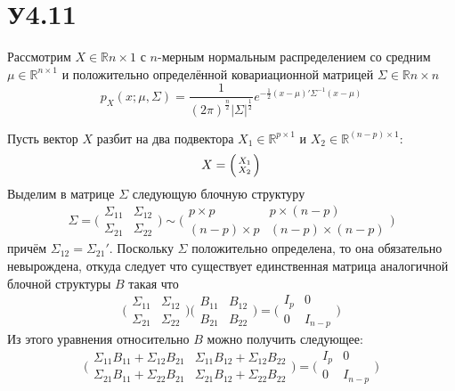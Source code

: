 \documentclass[a4paper]{article}
\newcommand{\Real}{\mathbb{R}}
\begin{document}

\section{У4.11} %
\label{sec:problem_4_11}

Рассмотрим $X\in \Real{n\times 1}$ с $n$-мерным нормальным распределением со
средним $\mu\in \Real^{n\times 1}$ и положительно определённой ковариационной
матрицей $\Sigma \in \Real{n\times n}$
\[
p_X(x;\mu,\Sigma)
= \frac{1}{(2\pi)^\frac{n}{2} \lvert \Sigma \rvert^\frac{1}{2}}
	e^{-\frac{1}{2}(x-\mu)'\Sigma^{-1}(x-\mu)}
\]

Пусть вектор $X$ разбит на два подвектора $X_1\in \Real^{p\times 1}$ и $X_2\in \Real^{(n-p)\times 1}$:
\[X = \Bigl(\begin{smallmatrix} X_1 \\ X_2 \end{smallmatrix}\Bigr)\]
Выделим в матрице $\Sigma$ следующую блочную структуру
\[
\Sigma
= \biggl(\begin{matrix}\Sigma_{11} & \Sigma_{12}\\\Sigma_{21} & \Sigma_{22}\end{matrix}\biggr)
\sim \biggl(\begin{matrix}p\times p & p\times (n-p)\\(n-p)\times p & (n-p)\times (n-p)\end{matrix}\biggr)
\]
причём $\Sigma_{12} = \Sigma_{21}'$. Поскольку $\Sigma$ положительно определена,
то она обязательно невырождена, откуда следует что существует единственная матрица
аналогичной блочной структуры $B$ такая что
\[
\biggl(\begin{matrix}\Sigma_{11} & \Sigma_{12}\\\Sigma_{21} & \Sigma_{22}\end{matrix}\biggr)
\biggl(\begin{matrix}B_{11} & B_{12}\\B_{21} & B_{22}\end{matrix}\biggr)
=
\biggl(\begin{matrix}I_p & 0\\0 & I_{n-p}\end{matrix}\biggr)
\]
Из этого уравнения относительно $B$ можно получить следующее:
\[
\biggl(\begin{matrix}
\Sigma_{11}B_{11} + \Sigma_{12}B_{21} & \Sigma_{11}B_{12} + \Sigma_{12}B_{22} \\
\Sigma_{21}B_{11} + \Sigma_{22}B_{21} & \Sigma_{21}B_{12} + \Sigma_{22}B_{22}
\end{matrix}\biggr)
= \biggl(\begin{matrix}I_p & 0\\0 & I_{n-p}\end{matrix}\biggr)
\]
\end{document}
